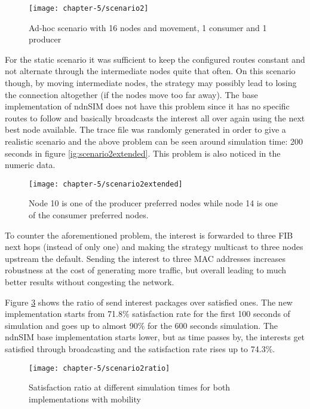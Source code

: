 \begin{figure}[H]
  \centering
  \texttt{[image: chapter-5/scenario2]}
  \caption{Ad-hoc scenario with 16 nodes and movement, 1 consumer and 1 producer}
  \label{fig:scenario2}
\end{figure}

For the static scenario it was sufficient to keep the configured routes constant and not alternate through the intermediate nodes quite that often. On this scenario though, by moving intermediate nodes, the strategy may possibly lead to losing the connection altogether (if the nodes move too far away). The base implementation of ndnSIM does not have this problem since it has no specific routes to follow and basically broadcasts the interest all over again using the next best node available. The trace file was randomly generated in order to give a realistic scenario and the above problem can be seen around simulation time: 200 seconds in figure \ref{ig:scenario2extended}. This problem is also noticed in the numeric data.

\begin{figure}[H]
  \centering
  \texttt{[image: chapter-5/scenario2extended]}
  \caption{Node 10 is one of the producer preferred nodes while node 14 is one of the consumer preferred nodes.}
  \label{fig:scenario2extended}
\end{figure}

To counter the aforementioned problem, the interest is forwarded to three FIB next hops (instead of only one) and making the strategy multicast to three nodes upstream the default. Sending the interest to three MAC addresses increases robustness at the cost of generating more traffic, but overall leading to much better results without congesting the network.

Figure \ref{fig:scenario2ratio} shows the ratio of send interest packages over satisfied ones. The new implementation starts from 71.8\% satisfaction rate for the first 100 seconds of simulation and goes up to almost 90\% for the 600 seconds simulation. The ndnSIM base implementation starts lower, but as time passes by, the interests get satisfied through broadcasting and the satisfaction rate rises up to 74.3\%.

\begin{figure}[H]
  \centering
  \texttt{[image: chapter-5/scenario2ratio]}
  \caption{Satisfaction ratio at different simulation times for both implementations with mobility}
  \label{fig:scenario2ratio}
\end{figure}

